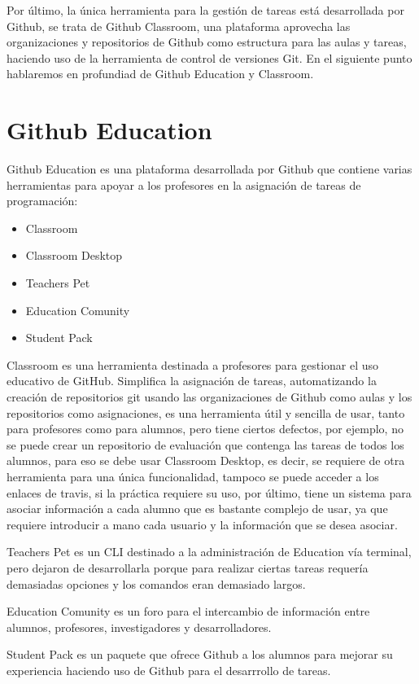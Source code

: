 Por último, la única herramienta para la gestión de tareas está desarrollada por Github, se trata de Github Classroom, una plataforma aprovecha las organizaciones y repositorios de Github como estructura para las aulas y tareas, haciendo uso de la herramienta de control de versiones Git. En el siguiente punto hablaremos en profundiad de Github Education y Classroom.


\section{Github Education}
\label{1:sec:2}

Github Education es una plataforma desarrollada por Github que contiene varias herramientas para apoyar a los profesores en la asignación de tareas de programación:

\begin{itemize}
  \item Classroom
  \item Classroom Desktop
  \item Teachers Pet  
  \item Education Comunity
  \item Student Pack
\end{itemize}

Classroom es una herramienta destinada a profesores para gestionar el uso educativo de GitHub. Simplifica la asignación de tareas, automatizando la creación de repositorios git usando las organizaciones de Github como aulas y los repositorios como asignaciones, es una herramienta útil y sencilla de usar, tanto para profesores como para alumnos, pero tiene ciertos defectos, por ejemplo, no se puede crear un repositorio de evaluación que contenga las tareas de todos los alumnos, para eso se debe usar Classroom Desktop, es decir, se requiere de otra herramienta para una única funcionalidad, tampoco se puede acceder a los enlaces de travis, si la práctica requiere su uso, por último, tiene un sistema para asociar información a cada alumno que es bastante complejo de usar, ya que requiere introducir a mano cada usuario y la información que se desea asociar.

Teachers Pet es un CLI destinado a la administración de Education vía terminal, pero dejaron de desarrollarla porque para realizar ciertas tareas requería demasiadas opciones y los comandos eran demasiado largos.

Education Comunity es un foro para el intercambio de información entre alumnos, profesores, investigadores y desarrolladores.

Student Pack es un paquete que ofrece Github a los alumnos para mejorar su experiencia haciendo uso de Github para el desarrrollo de tareas.



